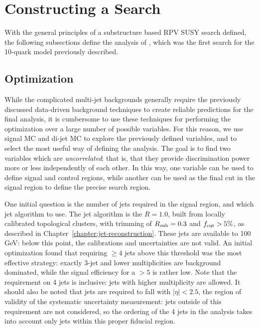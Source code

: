 \section{Constructing a Search}
\label{chapter:search:search}

With the general principles of a substructure based RPV SUSY search defined, the following subsections define the analysis of \cite{RPVSUSY}, which was the first search for the 10-quark model previously described.


\subsection{Optimization}
\label{chapter:search:search:optimization}

While the complicated multi-jet backgrounds generally require the previously discussed data-driven background techniques to create reliable predictions for the final analysis, it is cumbersome to use these techniques for performing the optimization over a large number of possible variables. For this reason, we use signal MC and \herwigpp di-jet MC to explore the previously defined variables, and to select the most useful way of defining the analysis. The goal is to find two variables which are \textit{uncorrelated}: that is, that they provide discrimination power more or less independently of each other. In this way, one variable can be used to define signal and control regions, while another can be used as the final cut in the signal region to define the precise search region.

One initial question is the number of jets required in the signal region, and which jet algorithm to use. The jet algorithm is the \antikt $R=1.0$, built from locally calibrated topological clusters, with trimming of $R_{\rm sub} = 0.3$ and $f_{\rm cut} > 5\%$, as described in Chapter~\ref{chapter:jet-reconstruction}. These jets are available to 100 GeV: below this point, the calibrations and uncertainties are not valid. An initial optimization found that requiring $\geq 4$ jets above this threshold was the most effective strategy: exactly 3-jet and lower multiplicities are background dominated, while the signal efficiency for a $> 5$ is rather low. Note that the requirement on 4 jets is inclusive: jets with higher multiplicity are allowed. It should also be noted that jets are required to fall with $|\eta| < 2.5$, the region of validity of the systematic uncertainty measurement: jets outside of this requirement are not considered, so the ordering of the 4 jets in the analysis takes into account only jets within this proper fiducial region.

